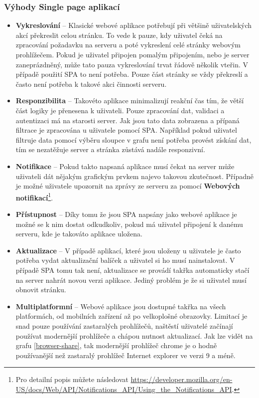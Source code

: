 \subsubsection{Výhody Single page aplikací}
\begin{itemize}
  \item \textbf{Vykreslování} -- Klasické webové aplikace potřebují při většině uživatelských akcí překreslit celou stránku. To vede k pauze, kdy uživatel čeká na zpracování požadavku na serveru a poté vykreslení celé stránky webovým prohlížečem. Pokud je uživatel připojen pomalým připojením, nebo je server zaneprázdněný, může tato pauza vykreslování trvat řádově několik vteřin. V případě použití SPA to není potřeba. Pouze část stránky se vždy překreslí a často není potřeba k takové akci činnosti serveru.
  \item \textbf{Responzibilita} -- Takovéto aplikace minimalizují reakční čas tím, že větší část logiky je přenesena k uživateli. Pouze zpracování dat, validaci a autentizaci má na starosti server. Jak jsou tato data zobrazena a přípaná filtrace je zpracována u uživatele pomocí SPA. Například pokud uživatel filtruje data pomocí výběru sloupce v grafu není potřeba provést získání dat, tím se nezatěžuje server a stránka zůstává nadále responzivní.
  \item \textbf{Notifikace} -- Pokud takto napsaná aplikace musí čekat na server může uživateli dát nějakým grafickým prvkem najevo takovou zkutečnost. Případně je možné uživatele upozornit na zprávy ze serveru za pomocí \textbf{Webových notifikací}\footnote{Pro detailní popis můžete následovat \url{https://developer.mozilla.org/en-US/docs/Web/API/Notifications_API/Using_the_Notifications_API}.}.
  \item \textbf{Přístupnost} -- Díky tomu že jsou SPA napsány jako webové aplikace je možné se k nim dostat odkudkoliv, pokud má uživatel připojení k danému serveru, kde je takováto aplikace uložena.
  \item \textbf{Aktualizace} -- V případě aplikací, které jsou uloženy u uživatele je často potřeba vydat aktualizační balíček a uživatel si ho musí nainstalovat. V případě SPA tomu tak není, aktualizace se provádí takřka automaticky stačí na server nahrát novou verzi aplikace. Jediný problém je že si uživatel musí obnovit stránku.
  \item \textbf{Multiplatformní} -- Webové aplikace jsou dostupné takřka na všech platformách, od mobilních zařízení až po velkoplošné obrazovky. Limitací je snad pouze používání zastaralých prohlížečů, naštěstí uživatelé začínají používat modernější prohlížeče a chápou nutnost aktualizací. Jak lze vidět na grafu \ref{browser-share}, tak modernější prohlížeč chrome je o hodně používanější než zastaralý prohlížeč Internet explorer ve verzi 9 a méně. \cite{SPA}
\end{itemize}
